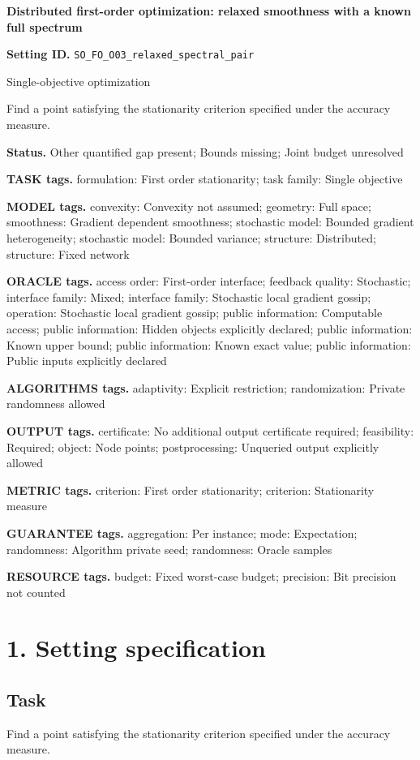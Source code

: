\documentclass[10pt,a4paper]{article}
\begin{document}
\raggedright

{\LARGE\bfseries\sffamily\color{AtlasNavy} Distributed first-order optimization: relaxed smoothness with a known full spectrum\par}\vspace{5pt}
\textbf{Setting ID.} \texttt{SO\_\allowbreak{}FO\_\allowbreak{}O03\_\allowbreak{}relaxed\_\allowbreak{}spectral\_\allowbreak{}pair}

Single-objective optimization

Find a point satisfying the stationarity criterion specified under the accuracy measure.

\textbf{Status.} Other quantified gap present; Bounds missing; Joint budget unresolved

\textbf{TASK tags.} formulation: First order stationarity; task family: Single objective

\textbf{MODEL tags.} convexity: Convexity not assumed; geometry: Full space; smoothness: Gradient dependent smoothness; stochastic model: Bounded gradient heterogeneity; stochastic model: Bounded variance; structure: Distributed; structure: Fixed network

\textbf{ORACLE tags.} access order: First-order interface; feedback quality: Stochastic; interface family: Mixed; interface family: Stochastic local gradient gossip; operation: Stochastic local gradient gossip; public information: Computable access; public information: Hidden objects explicitly declared; public information: Known upper bound; public information: Known exact value; public information: Public inputs explicitly declared

\textbf{ALGORITHMS tags.} adaptivity: Explicit restriction; randomization: Private randomness allowed

\textbf{OUTPUT tags.} certificate: No additional output certificate required; feasibility: Required; object: Node points; postprocessing: Unqueried output explicitly allowed

\textbf{METRIC tags.} criterion: First order stationarity; criterion: Stationarity measure

\textbf{GUARANTEE tags.} aggregation: Per instance; mode: Expectation; randomness: Algorithm private seed; randomness: Oracle samples

\textbf{RESOURCE tags.} budget: Fixed worst-case budget; precision: Bit precision not counted

\section{1. Setting specification}
\subsection{Task}
Find a point satisfying the stationarity criterion specified under the accuracy measure.
\end{document}
